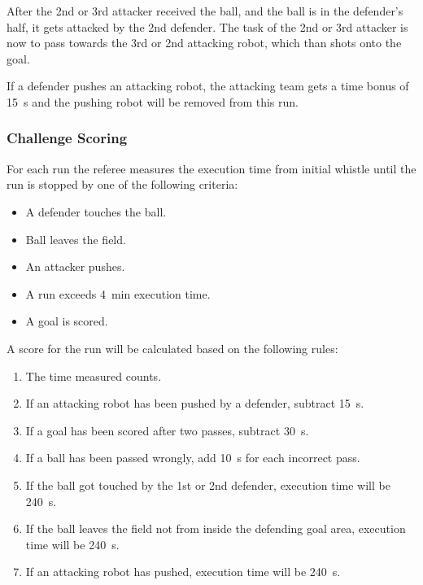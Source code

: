         After the 2nd or 3rd attacker received the ball, and the ball is in the defender's half, it gets attacked by the 2nd defender. The task of the 2nd or 3rd attacker is now to pass towards the 3rd or 2nd attacking robot, which than shots onto the goal.

        If a defender pushes an attacking robot, the attacking team gets a time bonus of \qty{15}{\second} and the pushing robot will be removed from this run.

    \subsubsection{Challenge Scoring}

        For each run the referee measures the execution time from initial whistle until the run is stopped by one of the following criteria:

        \begin{itemize}
            \item A defender touches the ball.
            \item Ball leaves the field.
            \item An attacker pushes.
            \item A run exceeds \qty{4}{\minute} execution time.
            \item A goal is scored.
        \end{itemize}

        A score for the run will be calculated based on the following rules:

        \begin{enumerate}
            \item The time measured counts.
            \item If an attacking robot has been pushed by a defender, subtract \qty{15}{\second}.
            \item If a goal has been scored after two passes, subtract \qty{30}{\second}.
            \item If a ball has been passed wrongly, add \qty{10}{\second} for each incorrect pass.
            \item If the ball got touched by the 1st or 2nd defender, execution time will be \qty{240}{\second}.
            \item If the ball leaves the field not from inside the defending goal area, execution time will be \qty{240}{\second}.
            \item If an attacking robot has pushed, execution time will be \qty{240}{\second}.
        \end{enumerate}

